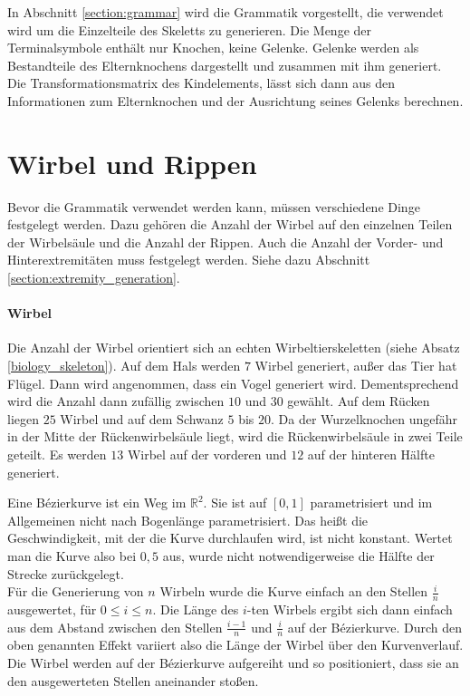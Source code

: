 In Abschnitt \ref{section:grammar} wird die Grammatik vorgestellt, die verwendet wird um die Einzelteile des Skeletts zu generieren. Die Menge der Terminalsymbole enthält nur Knochen, keine Gelenke. Gelenke werden als Bestandteile des Elternknochens dargestellt und zusammen mit ihm generiert. Die Transformationsmatrix des Kindelements, lässt sich dann aus den Informationen zum Elternknochen und der Ausrichtung seines Gelenks berechnen.


\section{Wirbel und Rippen}
\label{section:vertebrae_ribs}

Bevor die Grammatik verwendet werden kann, müssen verschiedene Dinge festgelegt werden. Dazu gehören die Anzahl der Wirbel auf den einzelnen Teilen der Wirbelsäule und die Anzahl der Rippen. Auch die Anzahl der Vorder- und Hinterextremitäten muss festgelegt werden. Siehe dazu Abschnitt \ref{section:extremity_generation}.

\paragraph{Wirbel}
Die Anzahl der Wirbel orientiert sich an echten Wirbeltierskeletten (siehe Absatz \ref{biology_skeleton}). Auf dem Hals werden $7$ Wirbel generiert, außer das Tier hat Flügel. Dann wird angenommen, dass ein Vogel generiert wird. Dementsprechend wird die Anzahl dann zufällig zwischen $10$ und $30$ gewählt. Auf dem Rücken liegen $25$ Wirbel und auf dem Schwanz $5$ bis $20$.
Da der Wurzelknochen ungefähr in der Mitte der Rückenwirbelsäule liegt, wird die Rückenwirbelsäule in zwei Teile geteilt. Es werden $13$ Wirbel auf der vorderen und $12$ auf der hinteren Hälfte generiert.

Eine Bézierkurve ist ein Weg im $\mathbb{R}^2$. Sie ist auf $[0, 1]$ parametrisiert  und im Allgemeinen nicht nach Bogenlänge parametrisiert. Das heißt die Geschwindigkeit, mit der die Kurve durchlaufen wird, ist nicht konstant. Wertet man die Kurve also bei $0,5$ aus, wurde nicht notwendigerweise die Hälfte der Strecke zurückgelegt.\\
Für die Generierung von $n$ Wirbeln wurde die Kurve einfach an den Stellen $\frac{i}{n}$ ausgewertet, für $0 \leq i \leq n$. Die Länge des $i$-ten Wirbels ergibt sich dann einfach aus dem Abstand zwischen den Stellen $\frac{i-1}{n}$ und $\frac{i}{n}$ auf der Bézierkurve. Durch den oben genannten Effekt variiert also die Länge der Wirbel über den Kurvenverlauf. Die Wirbel werden auf der Bézierkurve aufgereiht und so positioniert, dass sie an den ausgewerteten Stellen aneinander stoßen.

